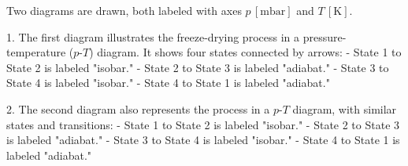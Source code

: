 Two diagrams are drawn, both labeled with axes \( p \, [\text{mbar}] \) and \( T \, [\text{K}] \).  

1. The first diagram illustrates the freeze-drying process in a pressure-temperature (\( p \)-\( T \)) diagram. It shows four states connected by arrows:  
   - State 1 to State 2 is labeled "isobar."  
   - State 2 to State 3 is labeled "adiabat."  
   - State 3 to State 4 is labeled "isobar."  
   - State 4 to State 1 is labeled "adiabat."  

2. The second diagram also represents the process in a \( p \)-\( T \) diagram, with similar states and transitions:  
   - State 1 to State 2 is labeled "isobar."  
   - State 2 to State 3 is labeled "adiabat."  
   - State 3 to State 4 is labeled "isobar."  
   - State 4 to State 1 is labeled "adiabat."